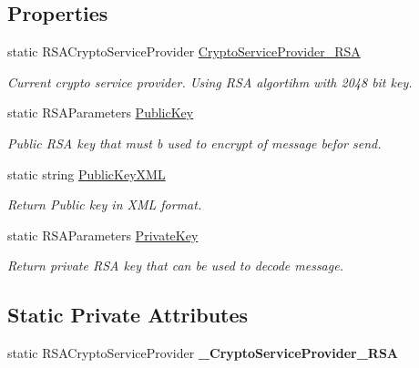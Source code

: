\subsection*{Properties}
\begin{DoxyCompactItemize}
\item 
static R\+S\+A\+Crypto\+Service\+Provider \mbox{\hyperlink{class_uniform_server_1_1_security_a_p_i_a382d85d8db483cd87e51ea8adfec2317}{Crypto\+Service\+Provider\+\_\+\+R\+SA}}
\begin{DoxyCompactList}\small\item\em Current crypto service provider. Using R\+SA algortihm with 2048 bit key. \end{DoxyCompactList}\item 
static R\+S\+A\+Parameters \mbox{\hyperlink{class_uniform_server_1_1_security_a_p_i_a0760e6025414a7cb1e19528fe8c4697d}{Public\+Key}}
\begin{DoxyCompactList}\small\item\em Public R\+SA key that must b used to encrypt of message befor send. \end{DoxyCompactList}\item 
static string \mbox{\hyperlink{class_uniform_server_1_1_security_a_p_i_a79bddf5d4d9a983f35629d2af14c1118}{Public\+Key\+X\+ML}}
\begin{DoxyCompactList}\small\item\em Return Public key in X\+ML format. \end{DoxyCompactList}\item 
static R\+S\+A\+Parameters \mbox{\hyperlink{class_uniform_server_1_1_security_a_p_i_ad2b3a776434e5529b4ed9b4d94ab122c}{Private\+Key}}
\begin{DoxyCompactList}\small\item\em Return private R\+SA key that can be used to decode message. \end{DoxyCompactList}\end{DoxyCompactItemize}
\subsection*{Static Private Attributes}
\begin{DoxyCompactItemize}
\item 
\mbox{\label{class_uniform_server_1_1_security_a_p_i_a705f1d9f4a89186f64ccf451c34e4d53}} 
static R\+S\+A\+Crypto\+Service\+Provider {\bfseries \+\_\+\+Crypto\+Service\+Provider\+\_\+\+R\+SA}
\end{DoxyCompactItemize}


